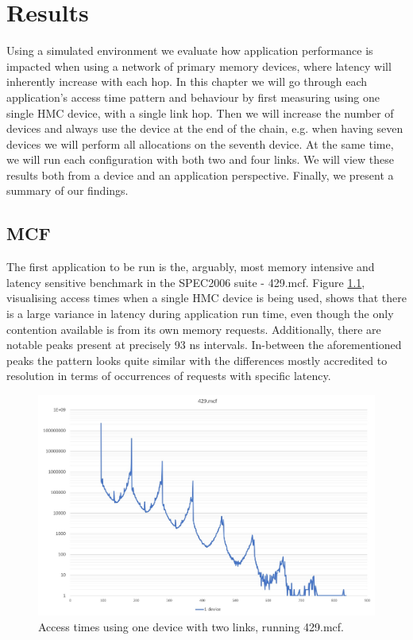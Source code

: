 \chapter{Results}
Using a simulated environment we evaluate how application performance is impacted when using a network of primary memory devices, where latency will inherently increase with each hop. In this chapter we will go through each application's access time pattern and behaviour by first measuring using one single HMC device, with a single link hop. Then we will increase the number of devices and always use the device at the end of the chain, e.g. when having seven devices we will perform all allocations on the seventh device. At the same time, we will run each configuration with both two and four links. We will view these results both from a device and an application perspective. Finally, we present a summary of our findings.


\section{MCF}
The first application to be run is the, arguably, most memory intensive and latency sensitive benchmark in the SPEC2006 suite - 429.mcf. Figure \ref{Memory-access-429-single}, visualising access times when a single HMC device is being used, shows that there is a large variance in latency during application run time, even though the only contention available is from its own memory requests. Additionally, there are notable peaks present at precisely 93 ns intervals. In-between the aforementioned peaks the pattern looks quite similar with the differences mostly accredited to resolution in terms of occurrences of requests with specific latency.
\bigskip

\begin{figure}[!ht]
    \centering
    \includegraphics[width=1.0\linewidth]{figure/429-x_4-1.jpg}
    \caption{Access times using one device with two links, running 429.mcf.}
    \label{Memory-access-429-single}
\end{figure}


